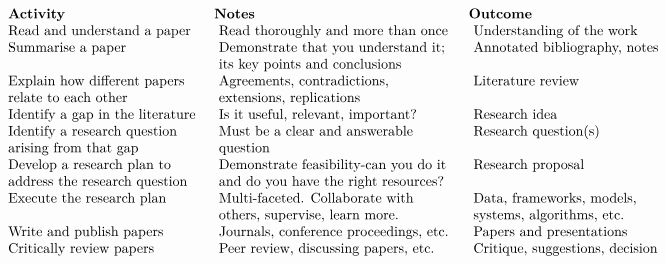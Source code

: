     $$\begin{array}{llll}\text { \textbf{Activity} } & \text {\textbf{Notes}} & \text
{\textbf{Outcome}} \\ \text { Read
and understand a paper } & \text { Read thoroughly and more than once } & \text { Understanding of
the work } \\ \text { Summarise a paper } & \text { Demonstrate that you understand it; } & \text {
Annotated bibliography, notes } \\ & \text { its key points and conclusions } & \\ \text { Explain
how different papers } & \text { Agreements, contradictions, } & \text { Literature review } \\
\text { relate to each other } & \text { extensions, replications } & \\ \text { Identify a gap in
the literature } & \text { Is it useful, relevant, important? } & \text { Research idea } \\ \text {
Identify a research question } & \text { Must be a clear and answerable } & \text { Research
question(s) } \\ \text { arising from that gap } & \text { question } \\ \text { Develop a research
plan to } & \text { Demonstrate feasibility-can you do it } & \text { Research proposal } \\ \text {
address the research question } & \text { and do you have the right resources? } & \\ \text {
Execute the research plan } & \text { Multi-faceted. Collaborate with } & \text { Data, frameworks,
models, } \\ & \text { others, supervise, learn more. } & \text { systems, algorithms, etc. } \\
\text { Write and publish papers } & \text { Journals, conference proceedings, etc. } & \text {
Papers and presentations } \\ \text { Critically review papers } & \text { Peer review, discussing
papers, etc. } & \text { Critique, suggestions, decision }\end{array}$$



